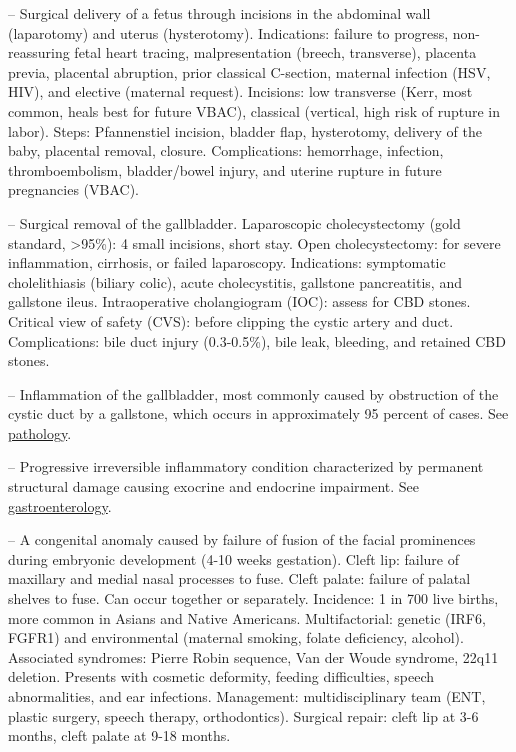 -- Surgical delivery of a fetus through incisions in the abdominal wall (laparotomy) and uterus (hysterotomy). Indications: failure to progress, non-reassuring fetal heart tracing, malpresentation (breech, transverse), placenta previa, placental abruption, prior classical C-section, maternal infection (HSV, HIV), and elective (maternal request). Incisions: low transverse (Kerr, most common, heals best for future VBAC), classical (vertical, high risk of rupture in labor). Steps: Pfannenstiel incision, bladder flap, hysterotomy, delivery of the baby, placental removal, closure. Complications: hemorrhage, infection, thromboembolism, bladder/bowel injury, and uterine rupture in future pregnancies (VBAC).

-- Surgical removal of the gallbladder. Laparoscopic cholecystectomy (gold standard, >95\%): 4 small incisions, short stay. Open cholecystectomy: for severe inflammation, cirrhosis, or failed laparoscopy. Indications: symptomatic cholelithiasis (biliary colic), acute cholecystitis, gallstone pancreatitis, and gallstone ileus. Intraoperative cholangiogram (IOC): assess for CBD stones. Critical view of safety (CVS): before clipping the cystic artery and duct. Complications: bile duct injury (0.3-0.5\%), bile leak, bleeding, and retained CBD stones.

-- Inflammation of the gallbladder, most commonly caused by obstruction of the cystic duct by a gallstone, which occurs in approximately 95 percent of cases. See \hyperlink{Pathology}{pathology}.

-- Progressive irreversible inflammatory condition characterized by permanent structural damage causing exocrine and endocrine impairment. See \hyperlink{Gastroenterology}{gastroenterology}.

-- A congenital anomaly caused by failure of fusion of the facial prominences during embryonic development (4-10 weeks gestation). Cleft lip: failure of maxillary and medial nasal processes to fuse. Cleft palate: failure of palatal shelves to fuse. Can occur together or separately. Incidence: 1 in 700 live births, more common in Asians and Native Americans. Multifactorial: genetic (IRF6, FGFR1) and environmental (maternal smoking, folate deficiency, alcohol). Associated syndromes: Pierre Robin sequence, Van der Woude syndrome, 22q11 deletion. Presents with cosmetic deformity, feeding difficulties, speech abnormalities, and ear infections. Management: multidisciplinary team (ENT, plastic surgery, speech therapy, orthodontics). Surgical repair: cleft lip at 3-6 months, cleft palate at 9-18 months.

